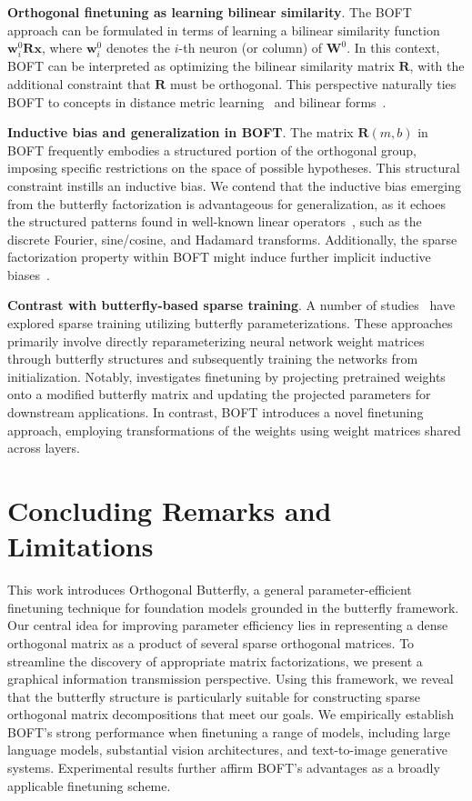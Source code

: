 \textbf{Orthogonal finetuning as learning bilinear similarity}. The BOFT approach can be formulated in terms of learning a bilinear similarity function $\bm{w}^0_i\bm{R}\bm{x}$, where $\bm{w}^0_i$ denotes the $i$-th neuron (or column) of $\bm{W}^0$. In this context, BOFT can be interpreted as optimizing the bilinear similarity matrix $\bm{R}$, with the additional constraint that $\bm{R}$ must be orthogonal. This perspective naturally ties BOFT to concepts in distance metric learning~\cite{xing2002distance} and bilinear forms~\cite{roman2005advanced}.

\textbf{Inductive bias and generalization in BOFT}. The matrix $\bm{R}(m,b)$ in BOFT frequently embodies a structured portion of the orthogonal group, imposing specific restrictions on the space of possible hypotheses. This structural constraint instills an inductive bias. We contend that the inductive bias emerging from the butterfly factorization is advantageous for generalization, as it echoes the structured patterns found in well-known linear operators~\cite{dao2019kaleidoscope}, such as the discrete Fourier, sine/cosine, and Hadamard transforms. Additionally, the sparse factorization property within BOFT might induce further implicit inductive biases~\cite{gunasekar2017implicit,li2018algorithmic,liu2019neural}.

\textbf{Contrast with butterfly-based sparse training}. A number of studies~\cite{dao2019learning,dao2019kaleidoscope,chen2022pixelated,dao2022monarch} have explored sparse training utilizing butterfly parameterizations. These approaches primarily involve directly reparameterizing neural network weight matrices through butterfly structures and subsequently training the networks from initialization. Notably, \cite{dao2022monarch} investigates finetuning by projecting pretrained weights onto a modified butterfly matrix and updating the projected parameters for downstream applications. In contrast, BOFT introduces a novel finetuning approach, employing transformations of the weights using weight matrices shared across layers.



\section{Concluding Remarks and Limitations}

This work introduces Orthogonal Butterfly, a general parameter-efficient finetuning technique for foundation models grounded in the butterfly framework. Our central idea for improving parameter efficiency lies in representing a dense orthogonal matrix as a product of several sparse orthogonal matrices. To streamline the discovery of appropriate matrix factorizations, we present a graphical information transmission perspective. Using this framework, we reveal that the butterfly structure is particularly suitable for constructing sparse orthogonal matrix decompositions that meet our goals. We empirically establish BOFT's strong performance when finetuning a range of models, including large language models, substantial vision architectures, and text-to-image generative systems. Experimental results further affirm BOFT's advantages as a broadly applicable finetuning scheme.

